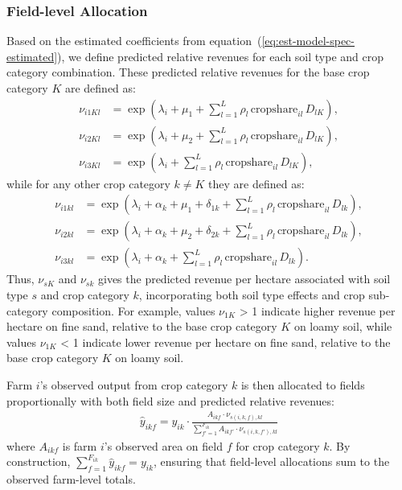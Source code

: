 \documentclass[12pt]{article}
\begin{document}
\subsubsection{Field-level Allocation}
Based on the estimated coefficients from equation~(\ref{eq:est-model-spec-estimated}), we define predicted relative revenues for each soil type and crop category combination.
These predicted relative revenues for the base crop category $K$ are defined as:
\begin{align*}
    \nu_{i1Kl} & = \exp\!\left(\lambda_i + \mu_1 + \sum_{l=1}^{L} \rho_l\,\text{cropshare}_{il}\,D_{lK}\right), \\
    \nu_{i2Kl} & = \exp\!\left(\lambda_i + \mu_2 + \sum_{l=1}^{L} \rho_l\,\text{cropshare}_{il}\,D_{lK}\right), \\
    \nu_{i3Kl} & = \exp\!\left( \lambda_i + \sum_{l=1}^{L} \rho_l\,\text{cropshare}_{il}\,D_{lK} \right),
\end{align*}
while for any other crop category $k \neq K$ they are defined as:
\begin{align*}
    \nu_{i1kl} & = \exp\!\left(\lambda_i + \alpha_k + \mu_1 + \delta_{1k} + \sum_{l=1}^{L} \rho_l\,\text{cropshare}_{il}\,D_{lk}\right), \\
    \nu_{i2kl} & = \exp\!\left(\lambda_i + \alpha_k + \mu_2 + \delta_{2k} + \sum_{l=1}^{L} \rho_l\,\text{cropshare}_{il}\,D_{lk}\right), \\
    \nu_{i3kl} & = \exp\!\left(\lambda_i + \alpha_k + \sum_{l=1}^{L} \rho_l\,\text{cropshare}_{il}\,D_{lk}\right).
\end{align*}
Thus, $\nu_{sK}$ and $\nu_{sk}$ gives the predicted revenue per hectare associated with soil type $s$ and crop category $k$, incorporating both soil type effects and crop sub-category composition.
For example, values $\nu_{1K}$ > 1 indicate higher revenue per hectare on fine sand, relative to the base crop category $K$ on loamy soil, while values $\nu_{1K}$ < 1 indicate lower revenue per hectare on fine sand, relative to the base crop category $K$ on loamy soil.

Farm $i$'s observed output from crop category $k$ is then allocated to fields proportionally with both field size and predicted relative revenues:
\begin{align}
    \hat{y}_{ikf} = y_{ik} \cdot \frac{A_{ikf} \cdot \nu_{s(i,k,f),kl}}
    {\sum_{f'=1}^{F_{ik}} A_{ikf'} \cdot \nu_{s(i,k,f'),kl}}
\end{align}
where $A_{ikf}$ is farm $i$'s observed area on field $f$ for crop category $k$.
By construction, $\sum_{f=1}^{F_{ik}} \hat{y}_{ikf} = y_{ik}$, ensuring that field-level allocations sum to the observed farm-level totals.
\end{document}
